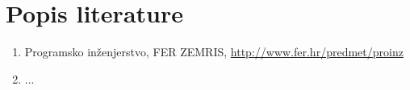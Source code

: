 \chapter*{Popis literature}
	 	
		
		
		\begin{enumerate}
			
			
			\item  Programsko inženjerstvo, FER ZEMRIS, \url{http://www.fer.hr/predmet/proinz}
			
			\item  ...
			
		\end{enumerate}
		
		 
